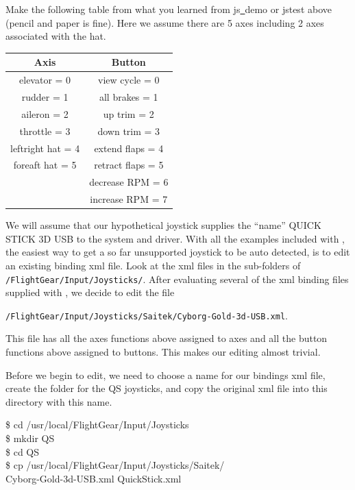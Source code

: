  Make the following table from what you learned from js\underline{~}demo or jstest above (pencil and paper is fine).  Here we assume there are 5 axes including 2 axes associated with the hat.
\medskip

\begin{tabular}{c|c}
		Axis			      &           Button\\\hline
	elevator 	= 0	     &     	view cycle 	= 0\\
	rudder 		= 1	     &     	all brakes 	= 1\\
	aileron 	= 2	     &      	up trim 	= 2\\
	throttle 	= 3		   &       down trim 	= 3\\
	leftright hat 	= 4&	    	extend flaps	= 4\\
	foreaft hat 	= 5	&	      retract flaps	= 5\\
					          &        decrease RPM	= 6\\
					          &        increase RPM	= 7
\end{tabular}
\medskip


We will assume that our hypothetical joystick supplies the ``name'' QUICK STICK 3D USB to the system and driver. With all the examples included with \FlightGear{}, the easiest way to get a so far unsupported joystick to be auto detected, is to edit an existing binding xml file.  Look at the xml files in the sub-folders of \texttt{/FlightGear/Input/Joysticks/}. After evaluating several of the xml binding files supplied with \FlightGear{}, we decide to edit the file

\noindent
 \texttt{/FlightGear/Input/Joysticks/Saitek/Cyborg-Gold-3d-USB.xml}. 
 
 \noindent
  This file has all the axes functions above assigned to axes and all the button functions above assigned to buttons.  This makes our editing almost trivial.

Before we begin to edit, we need to choose a name for our bindings xml file, create the folder for the QS joysticks, and copy the original xml file into this directory with this name.
\medskip


\begin{ttfamily}
\noindent
\$ cd /usr/local/FlightGear/Input/Joysticks\\
\$ mkdir QS\\
\$ cd QS\\
\$ cp  /usr/local/FlightGear/Input/Joysticks/Saitek/\\
Cyborg-Gold-3d-USB.xml  QuickStick.xml
\end{ttfamily}
\medskip

